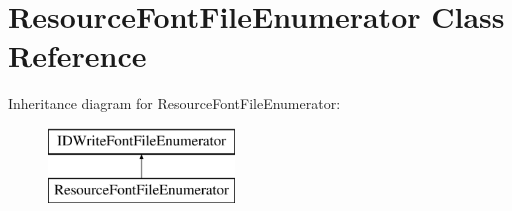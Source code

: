 \hypertarget{class_resource_font_file_enumerator}{\section{Resource\-Font\-File\-Enumerator Class Reference}
\label{class_resource_font_file_enumerator}
}
Inheritance diagram for Resource\-Font\-File\-Enumerator\-:\begin{figure}[H]
\begin{center}
\leavevmode
\includegraphics[height=2.000000cm]{class_resource_font_file_enumerator}
\end{center}
\end{figure}
